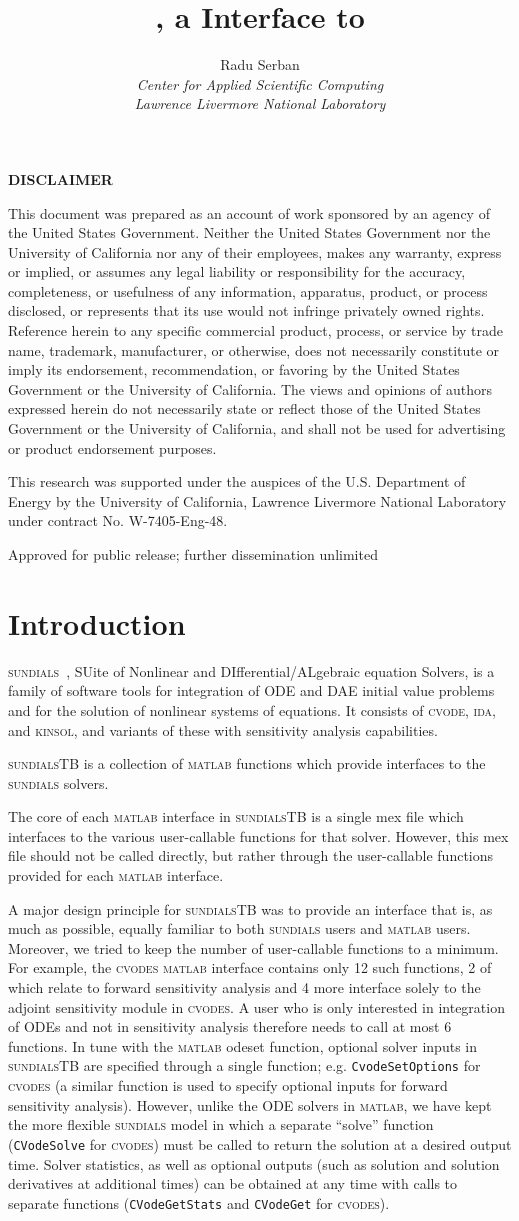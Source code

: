 \documentclass[titlepage,10pt]{article}
\title{{\sundialsTB} {\STBrelease}, a {\matlab} Interface to {\sundials}}
\author{
  Radu Serban \\ 
  {\em Center for Applied Scientific Computing} \\ 
  {\em Lawrence Livermore National Laboratory}
}
\date{
  \today
  \vfill 
  {\centerline{\psfig{figure=doc_logo.eps,width=0.5\textwidth}}}
  \vfill \STBucrl}
\newcommand{\disclaimer}{%
\changetext{.625in}{}{}{}{}
\thispagestyle{empty}%
\vglue5\baselineskip
\begin{center}
{\bf DISCLAIMER}
\end{center}
\noindent
This document was prepared as an account of work sponsored by an agency of the
United States Government.  Neither the United States Government nor the University
of California nor any of their employees, makes any warranty, express or implied,
or assumes any legal liability or responsibility for the accuracy, completeness,
or usefulness of any information, apparatus, product, or process disclosed, or
represents that its use would not infringe privately owned rights. Reference
herein to any specific commercial product, process, or service by trade name,
trademark, manufacturer, or otherwise, does not necessarily constitute or imply
its endorsement, recommendation, or favoring by the United States Government
or the University of California.  The views and opinions of authors expressed
herein do not necessarily state or reflect those of the United States Government
or the University of California, and shall not be used for advertising or
product endorsement purposes.

\vskip2\baselineskip
This research was supported under the auspices of the U.S. Department of Energy by
the University of California, Lawrence Livermore National Laboratory under
contract No.  W-7405-Eng-48.
\vfill
\begin{center}
Approved for public release; further dissemination unlimited
\end{center}
\clearpage
\changetext{-.625in}{}{}{}{}
}
\newcommand{\clearemptydoublepage}{\newpage{\pagestyle{empty}\cleardoublepage}}
\newcommand{\sundialsTB}{{\normalfont\scshape sundialsTB}}
\newcommand{\sundials}{{\normalfont\scshape sundials}}
\newcommand{\cvode}{{\normalfont\scshape cvode}}
\newcommand{\cvodes}{{\normalfont\scshape cvodes}}
\newcommand{\ida}{{\normalfont\scshape ida}}
\newcommand{\kinsol}{{\normalfont\scshape kinsol}}
\newcommand{\matlab}{{\normalfont\scshape matlab}}
\begin{document}
\pagestyle{empty}
\maketitle
\disclaimer

\tableofcontents

\clearemptydoublepage

\pagestyle{plain}

\section{Introduction}

{\sundials}~\cite{HBGLSSW:04}, SUite of Nonlinear and DIfferential/ALgebraic equation Solvers,
is a family of software tools for integration of ODE and DAE initial value problems
and for the solution of nonlinear systems of equations.
It consists of {\cvode}, {\ida}, and {\kinsol}, and variants of these with 
sensitivity analysis capabilities.

{\sundialsTB} is a collection of {\matlab} functions which provide interfaces to
the {\sundials} solvers.

The core of each {\matlab} interface in {\sundialsTB} is a single {\sc mex} 
file which interfaces to the various user-callable functions for that solver.
However, this {\sc mex} file should not be called directly, but rather through the 
user-callable functions provided for each {\matlab} interface.

A major design principle for {\sundialsTB}
was to provide an interface that is, as much as possible, equally familiar to
both {\sundials} users and {\matlab} users. Moreover, we tried to keep the
number of user-callable functions to a minimum. For example, the {\cvodes} {\matlab} 
interface contains only 12 such functions, 2 of which relate to forward sensitivity analysis and
4 more interface solely to the adjoint sensitivity module in {\cvodes}. 
A user who is only interested in integration of ODEs and not in sensitivity analysis
therefore needs to call at most 6 functions.
In tune with the {\matlab} {\sc odeset} function, optional
solver inputs in {\sundialsTB} are specified through a single function; e.g.
{\tt CvodeSetOptions} for {\cvodes} (a similar function is used to specify optional
inputs for forward sensitivity analysis). However, unlike the ODE solvers in {\matlab}, we
have kept the more flexible {\sundials} model in which a separate ``solve'' function 
({\tt CVodeSolve} for {\cvodes}) must be called to return the solution at a desired 
output time. Solver statistics, as well as optional outputs (such as
solution and solution derivatives at additional times) can be obtained at any time
with calls to separate functions ({\tt CVodeGetStats} and {\tt CVodeGet} for {\cvodes}).
\end{document}
